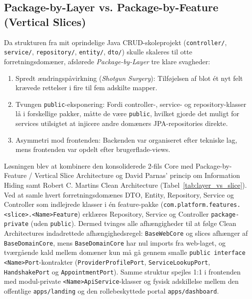 \documentclass[11pt,a4paper]{article}
\begin{document}
\begin{table}[htbp]
\subsection{Package-by-Layer vs. Package-by-Feature (Vertical Slices)}
Da strukturen fra mit oprindelige Java CRUD-skoleprojekt (\texttt{controller/}, \texttt{service/}, \texttt{repository/}, \texttt{entity/}, \texttt{dto/}) skulle skaleres til otte forretningsdomæner, afslørede \textit{Package-by-Layer} tre klare svagheder:
\begin{enumerate}[noitemsep]
    \item Spredt ændringspåvirkning (\textit{Shotgun Surgery}): Tilføjelsen af blot ét nyt felt krævede rettelser i fire til fem adskilte mapper.
    \item Tvungen \texttt{public}-eksponering: Fordi controller-, service- og repository-klasser lå i forskellige pakker, måtte de være \texttt{public}, hvilket gjorde det muligt for services utilsigtet at injicere andre domæners JPA-repositories direkte.
    \item Asymmetri mod frontenden: Backenden var organiseret efter tekniske lag, mens frontenden var opdelt efter brugerflade-views.
\end{enumerate}

Løsningen blev at kombinere den konsoliderede 2-fils Core med Package-by-Feature / Vertical Slice Architecture \cite{bogard2018} og David Parnas' princip om Information Hiding \cite{parnas1972} samt Robert C. Martins Clean Architecture \cite{martin2017} (Tabel~\ref{tab:layer_vs_slice}). Ved at samle hvert forretningsdomænes DTO, Entity, Repository, Service og Controller som indlejrede klasser i én feature-pakke (\texttt{com.platform.features.<slice>.<Name>Feature}) erklæres Repository, Service og Controller \texttt{package-private} (uden \texttt{public}). Dermed tvinges alle afhængigheder til at følge Clean Architectures indadrettede afhængighedsregel: \texttt{BaseWebCore} og slices afhænger af \texttt{BaseDomainCore}, mens \texttt{BaseDomainCore} har nul imports fra web-laget, og tværgående kald mellem domæner kun må gå gennem smalle \texttt{public interface <Name>Port}-kontrakter (\texttt{ProviderProfilePort}, \texttt{ServiceLookupPort}, \texttt{HandshakePort} og \texttt{AppointmentPort}). Samme struktur spejles 1:1 i frontenden med modul-private \texttt{<Name>ApiService}-klasser og fysisk adskillelse mellem den offentlige \texttt{apps/landing} og den rollebeskyttede portal \texttt{apps/dashboard}.


\end{table}
\end{document}
